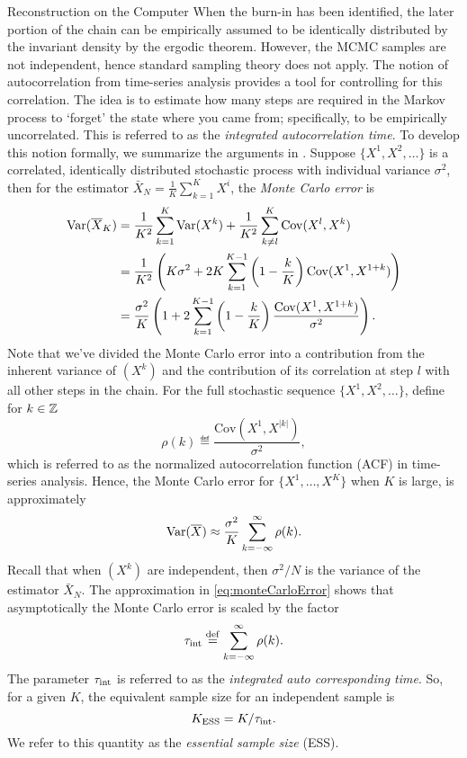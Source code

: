 \begin{chapter}{Reconstruction on the Computer}
When the burn-in has been identified, the later portion of the chain can be empirically assumed to be identically distributed by the invariant density by the ergodic theorem. 
However, the MCMC samples are not independent, hence standard sampling theory does not apply.
The notion of autocorrelation from time-series analysis provides a tool for controlling for this correlation.
The idea is to estimate how many steps are required in the Markov process to `forget' the state where you came from; specifically, to be empirically uncorrelated.
This is referred to as the \emph{integrated autocorrelation time}.
To develop this notion formally, we summarize the arguments in \citep{sokal1997monte}. 
Suppose $\{X^1,X^2,\dots\}$ is a correlated, identically distributed stochastic process with individual variance $\sigma^2$, then for the estimator $\bar X_N=\frac1K\sum_{k=1}^KX^i$, the {\em Monte Carlo error} is  
\begin{align}
{\rm Var}(\bar X_K)
  &=\frac{1}{K^2}\sum_{k=1}^K{\rm Var}(X^k)+\frac{1}{K^2}\sum_{k\neq l}^K {\rm Cov}(X^l,X^k)\nonumber\\
  &=\frac{1}{K^2}\left(K\sigma^2+2K\sum_{k=1}^{K-1}\left(1-\frac{k}{K}\right){\rm Cov}(X^1,X^{1+k})\right)\nonumber\\
  &=\frac{\sigma^2}{K}\left(1+2\sum_{k=1}^{K-1}\left(1-\frac{k}{K}\right)\frac{{\rm Cov}(X^1,X^{1+k})}{\sigma^2}\right).
\end{align}
Note that we've divided the Monte Carlo error into a contribution from the inherent variance of $(X^k)$ and the contribution of its correlation at step $l$ with all other steps in the chain.
For the full stochastic sequence $\{X^1,X^2,\dots\}$, define for $k \in \Z$
\begin{equation}
  \rho(k) \eqdef \frac{\mathrm{Cov}(X^1, X^{|k|})}{\sigma^2},
\end{equation}
which is referred to as the normalized autocorrelation function (ACF) in time-series analysis.
Hence, the Monte Carlo error for $\{X^1,\dots,X^K\}$ when $K$ is large, is approximately 
\begin{equation} \label{eq:monteCarloError}
{\rm Var}(\bar X) \approx \frac{\sigma^2}{K}\sum_{k=-\infty}^\infty \rho(k).
\end{equation}
Recall that when $(X^k)$ are independent, then $\sigma^2/N$ is the variance of the estimator $\bar X_N$.
The approximation in \eqref{eq:monteCarloError} shows that asymptotically the Monte Carlo error is scaled by the factor
\begin{equation}
  \tau_{\rm int}\eqdef \sum_{k=-\infty}^\infty \rho(k).
\end{equation}
The parameter $\tau_{\rm int}$ is referred to as the \emph{integrated auto corresponding time}.
So, for a given $K$, the equivalent sample size for an independent sample is
\begin{equation}
  K_{\rm ESS} = K/\tau_{\rm int}.
\end{equation}
We refer to this quantity as the \emph{essential sample size} (ESS).


\end{chapter}
